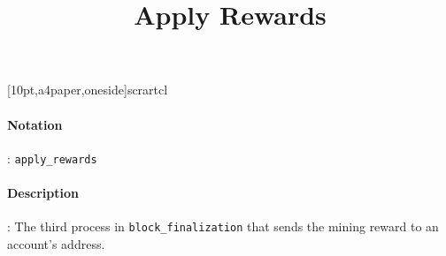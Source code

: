 [10pt,a4paper,oneside]{scrartcl}
\usepackage[latin1]{inputenc}
\usepackage{amsmath}
\usepackage{amsfonts}
\usepackage{amssymb}
\usepackage{makeidx}
\usepackage{graphicx}
\usepackage{booktabs}
\usepackage[
	authordate,
	strict,
	backend=biber
]
{biblatex-chicago}
\usepackage{mathtools}
\author{}
\title{Apply Rewards}
\date{}


\maketitle
\paragraph{Notation}: \texttt{apply\_rewards} 
\paragraph{Description}: The third process in \texttt{block\_finalization} that sends the mining reward to an account's address. 




